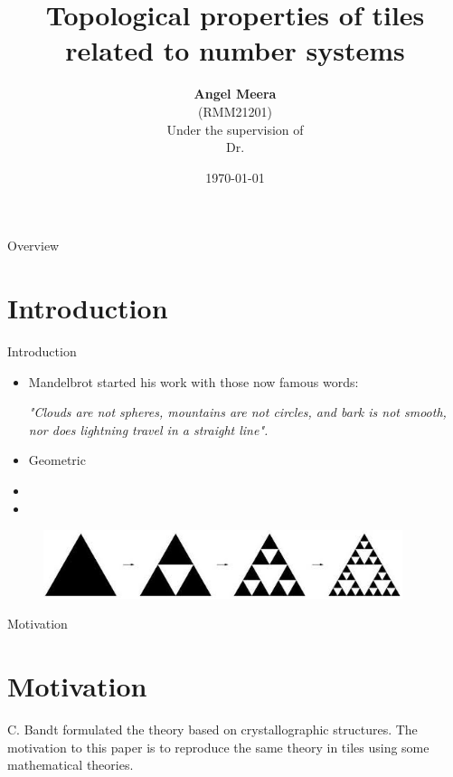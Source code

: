 \documentclass[11pt]{beamer}
\title[A Study on Self-similar Tilings]{ Topological properties of tiles related to number systems  }
\author[Angel Meera]{\textbf {Angel Meera}\\ {(RMM21201)} \\
\vspace{0.2cm}Under the supervision of\\\vspace{0.2cm} Dr.  }
\institute[IIITL]{\large{\small  Indian Institute of Information Technology,  Lucknow}\vspace{0.5cm}}
\date[Today]{\today} %
\begin{document}
\maketitle

\begin{frame}{Overview}
\tableofcontents
\end{frame}

\section{Introduction}
\begin{frame}{Introduction}
    \begin{itemize}
        \item  Mandelbrot started his work with those now famous words:\\
    \begin{center}
    \textit{"Clouds are not spheres, mountains are not circles,  and bark is not smooth, nor does lightning travel in a straight line".}
    \end{center}
        \pause 
        \item Geometric
        \pause 
        \item
        \item 
    \end{itemize}
    
\begin{figure}
\includegraphics[height=2cm]{Sier.jpg}
\caption{}
\end{figure}
\end{frame}



\begin{frame}{Motivation}
\section{Motivation}
\begin{block}
    
C. Bandt formulated the theory based on crystallographic structures. The motivation to this paper is to reproduce the same theory in tiles using some mathematical theories. 
 \end{block}   
\end{frame}
\end{document}
